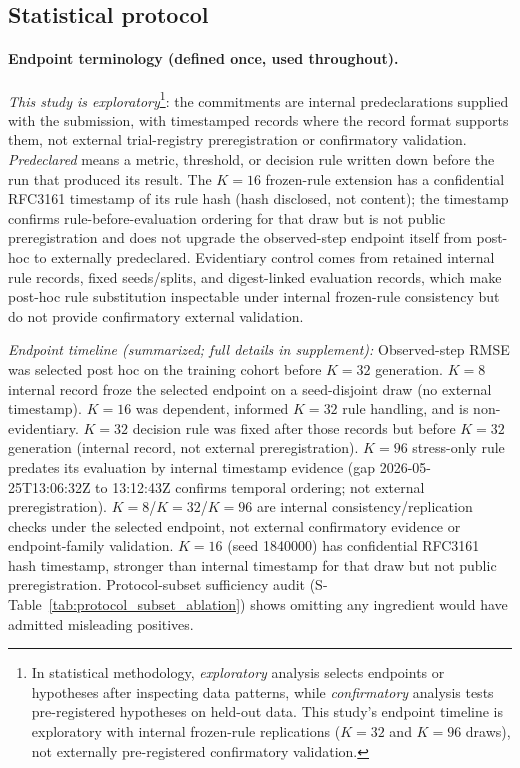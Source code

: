 \documentclass{article}
\begin{document}
\subsection{Statistical protocol}\label{sec:statistical-protocol}
\paragraph{Endpoint terminology (defined once, used throughout).}
\emph{This study is exploratory}\footnote{In statistical methodology, \emph{exploratory} analysis selects endpoints or hypotheses after inspecting data patterns, while \emph{confirmatory} analysis tests pre-registered hypotheses on held-out data. This study's endpoint timeline is exploratory with internal frozen-rule replications ($K=32$ and $K=96$ draws), not externally pre-registered confirmatory validation.}: the commitments are internal predeclarations supplied with the submission, with timestamped records where the record format supports them, not external trial-registry preregistration or confirmatory validation. \emph{Predeclared} means a metric, threshold, or decision rule written down before the run that produced its result. The $K=16$ frozen-rule extension has a confidential RFC3161 timestamp of its rule hash (hash disclosed, not content); the timestamp confirms rule-before-evaluation ordering for that draw but is not public preregistration and does not upgrade the observed-step endpoint itself from post-hoc to externally predeclared. Evidentiary control comes from retained internal rule records, fixed seeds/splits, and digest-linked evaluation records, which make post-hoc rule substitution inspectable under internal frozen-rule consistency but do not provide confirmatory external validation.

\emph{Endpoint timeline (summarized; full details in supplement):} Observed-step RMSE was selected post hoc on the training cohort before $K=32$ generation. $K=8$ internal record froze the selected endpoint on a seed-disjoint draw (no external timestamp). $K=16$ was dependent, informed $K=32$ rule handling, and is non-evidentiary. $K=32$ decision rule was fixed after those records but before $K=32$ generation (internal record, not external preregistration). $K=96$ stress-only rule predates its evaluation by internal timestamp evidence (gap 2026-05-25T13:06:32Z to 13:12:43Z confirms temporal ordering; not external preregistration). $K=8$/$K=32$/$K=96$ are internal consistency/replication checks under the selected endpoint, not external confirmatory evidence or endpoint-family validation. $K=16$ (seed 1840000) has confidential RFC3161 hash timestamp, stronger than internal timestamp for that draw but not public preregistration. Protocol-subset sufficiency audit (S-Table~\ref{tab:protocol_subset_ablation}) shows omitting any ingredient would have admitted misleading positives.
\end{document}
